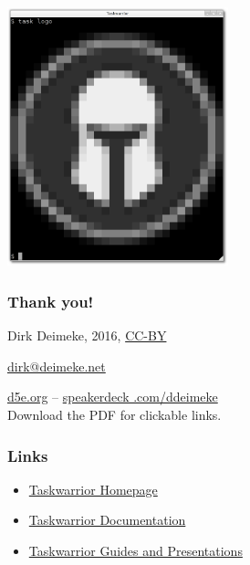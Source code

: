 \documentclass[t,handout,aspectratio=169]{beamer}
\begin{document}
\begin{frame}[fragile]
    \vfill
    \begin{center}
        \includegraphics[width=6.4cm,height=7.5cm]{task_logo.png}
    \end{center}
\end{frame}

\begin{frame}[fragile]\frametitle{Thank you!}
    \vfill
    \begin{center}
        Dirk Deimeke, 2016, \href{https://creativecommons.org/licenses/by/4.0/}{CC-BY}

        \href{mailto:dirk@deimeke.net}{dirk@deimeke.net}

        \href{https://d5e.org/}{d5e.org} -- \href{https://speakerdeck.com/ddeimeke/}{speakerdeck    .com/ddeimeke} \\
        {\tiny Download the PDF for clickable links.}
    \end{center}
\end{frame}

\begin{frame}[fragile]\frametitle{Links}
    \vfill
    \begin{itemize}
        \item \href{https://taskwarrior.org/}{Taskwarrior Homepage}
        \item \href{https://taskwarrior.org/docs/}{Taskwarrior Documentation}
        \item \href{https://git.tasktools.org/projects/ST/repos/guides/browse}{Taskwarrior Guides and Presentations}
    \end{itemize}
\end{frame}
\end{document}

